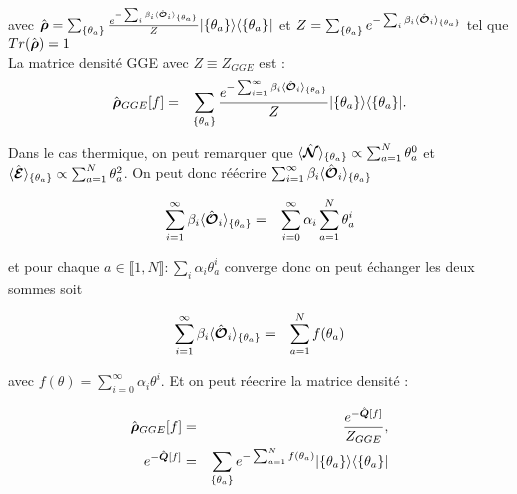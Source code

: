	avec $\hat{\bm{\rho}} = \sum_{\{\theta_a \}}\frac{e^{-\sum_i \beta_i \langle \hat{\bm{\mathcal{O}}}_i \rangle_{\{\theta_a \}} }}{Z} \vert \{\theta_a \}  \rangle   	\langle \{\theta_a \} \vert $ et $Z = \sum_{\{\theta_a \}}e^{-\sum_i \beta_i \langle \hat{\bm{\mathcal{O}}}_i \rangle_{ \{\theta_a \} } } $ tel que $Tr (  \hat{\bm{\rho}}) = 1 $\\
	



La matrice densité GGE avec $Z \equiv Z_{GGE}$ est :
	\begin{eqnarray}
		\hat{\bm{\rho}}_{GGE}[f] & = & \sum_{\{\theta_a \}}\frac{e^{-\sum_{i = 1}^\infty  \beta_i \langle \hat{\bm{\mathcal{O}}}_i \rangle_{\{\theta_a \}} }}{Z} \vert \{\theta_a \}  \rangle   	\langle \{\theta_a \} \vert. 
	\end{eqnarray}
	
	Dans le cas thermique, on peut remarquer que $\langle \hat{\bm{\mathcal{N}}} \rangle_{\{ \theta_a\} } \propto \sum_{a = 1}^N \theta_a^0 $ et $\langle \hat{\bm{\mathcal{E}}} \rangle_{\{ \theta_a\} } \propto \sum_{a = 1}^N \theta_a^2 $. On peut donc réécrire $\sum_{i = 1}^\infty  \beta_i \langle \hat{\bm{\mathcal{O}}}_i \rangle_{ \{\theta_a \} }$
	
	\begin{eqnarray}
		\sum_{i = 1}^\infty  \beta_i \langle \hat{\bm{\mathcal{O}}}_i \rangle_{ \{\theta_a \} } & = & \sum_{i = 0}^\infty \alpha_i \sum_{a = 1 }^N \theta_a^i		
	\end{eqnarray}
	
	et pour chaque $a \in \llbracket 1 , N  \rrbracket \colon \sum_i \alpha_i \theta_a^i$ converge donc on peut échanger les deux sommes soit 
	
	\begin{eqnarray}
		\sum_{i = 1}^\infty  \beta_i \langle \hat{\bm{\mathcal{O}}}_i \rangle_{ \{\theta_a \} } & = & \sum_{a = 1 }^N  f(\theta_a) 
	\end{eqnarray}
	
	avec $f(\theta) =  \sum_{i = 0}^\infty \alpha_i  \theta^i$.	 Et on peut réecrire la matrice densité  :
	
	\begin{eqnarray}
		\hat{\bm{\rho}}_{GGE}[f] & = & \frac{e^{-\hat{\bm{Q}}[f]}}{Z_{GGE}}, \\
		e^{-\hat{\bm{Q}}[f]} & = & 	\sum_{\{\theta_a \}} e^{- \sum_{a = 1}^N f(\theta_a) } \vert \{ \theta_a\} \rangle \langle  \{ \theta_a\}  \vert 
	\end{eqnarray}
 
